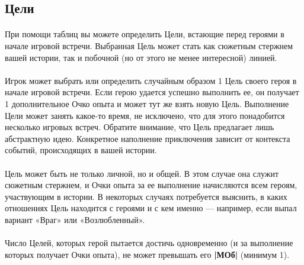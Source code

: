 \subsection{Цели}
\paragraph{}
При помощи таблиц вы можете определить Цели, встающие перед героями в начале игровой встречи. Выбранная Цель может стать как сюжетным стержнем вашей истории, так и побочной (но от этого не менее интересной) линией.
\paragraph{}
Игрок может выбрать или определить случайным образом 1 Цель своего героя в начале игровой встречи. Если герою удается успешно выполнить ее, он получает 1 дополнительное Очко опыта и может тут же взять новую Цель. Выполнение Цели может занять какое-то время, не исключено, что для этого понадобится несколько игровых встреч. Обратите внимание, что Цель предлагает лишь абстрактную идею. Конкретное наполнение приключения зависит от контекста событий, происходящих в вашей истории.
\paragraph{}
Цель может быть не только личной, но и общей. В этом случае она служит сюжетным стержнем, и Очки опыта за ее выполнение начисляются всем героям, участвующим в истории. В некоторых случаях потребуется выяснить, в каких отношениях Цель находится с героями и с кем именно — например, если выпал вариант «Враг» или «Возлюбленный».
\paragraph{}
Число Целей, которых герой пытается достичь одновременно (и за выполнение которых получает Очки опыта), не может превышать его \textbf{|МОб|} (минимум 1).
